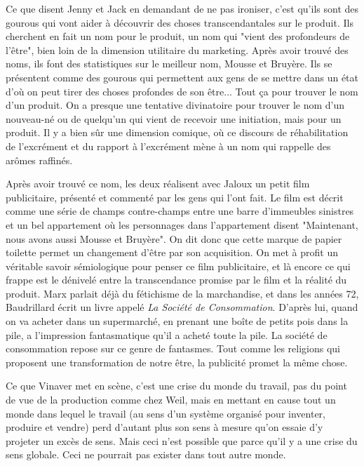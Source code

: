 \documentclass[a4paper,12pt]{book}
\begin{document}
\par Ce que disent Jenny et Jack en demandant de ne pas ironiser, c'est qu'ils sont des gourous qui vont aider à découvrir des choses transcendantales sur le produit. Ils cherchent en fait un nom pour le produit, un nom qui "vient des profondeurs de l'être", bien loin de la dimension utilitaire du marketing. Après avoir trouvé des noms, ils font des statistiques sur le meilleur nom, Mousse et Bruyère. Ils se présentent comme des gourous qui permettent aux gens de se mettre dans un état d'où on peut tirer des choses profondes de son être... Tout ça pour trouver le nom d'un produit. On a presque une tentative divinatoire pour trouver le nom d'un nouveau-né ou de quelqu'un qui vient de recevoir une initiation, mais pour un produit. Il y a bien sûr une dimension comique, où ce discours de réhabilitation de l'excrément et du rapport à l'excrément mène à un nom qui rappelle des arômes raffinés.
\par Après avoir trouvé ce nom, les deux réalisent avec Jaloux un petit film publicitaire, présenté et commenté par les gens qui l'ont fait. Le film est décrit comme une série de champs contre-champs entre une barre d'immeubles sinistres et un bel appartement où les personnages dans l'appartement disent "Maintenant, nous avons aussi Mousse et Bruyère". On dit donc que cette marque de papier toilette permet un changement d'être par son acquisition. On met à profit un véritable savoir sémiologique pour penser ce film publicitaire, et là encore ce qui frappe est le dénivelé entre la transcendance promise par le film et la réalité du produit. Marx parlait déjà du fétichisme de la marchandise, et dans les années 72, Baudrillard écrit un livre appelé \textit{La Société de Consommation}. D'après lui, quand on va acheter dans un supermarché, en prenant une boîte de petits pois dans la pile, a l'impression fantasmatique qu'il a acheté toute la pile. La société de consommation repose sur ce genre de fantasmes. Tout comme les religions qui proposent une transformation de notre être, la publicité promet la même chose.
\par Ce que Vinaver met en scène, c'est une crise du monde du travail, pas du point de vue de la production comme chez Weil, mais en mettant en cause tout un monde dans lequel le travail (au sens d'un système organisé pour inventer, produire et vendre) perd d'autant plus son sens à mesure qu'on essaie d'y projeter un excès de sens. Mais ceci n'est possible que parce qu'il y a une crise du sens globale. Ceci ne pourrait pas exister dans tout autre monde.
\end{document}
